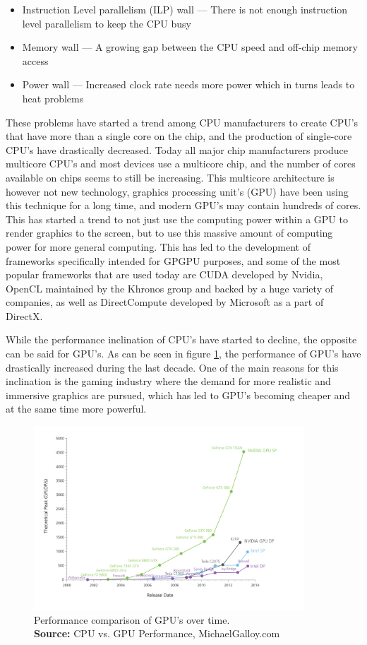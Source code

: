 \begin{itemize}
    \item Instruction Level parallelism (ILP) wall --- There is not enough instruction level parallelism to keep the CPU busy
    \item Memory wall --- A growing gap between the CPU speed and off-chip memory access
    \item Power wall --- Increased clock rate needs more power which in turns leads to heat problems
\end{itemize}

These problems have started a trend among CPU manufacturers to create CPU's that have more than a single core on the chip, and the production of single-core CPU's have drastically decreased. Today all major chip manufacturers produce multicore CPU's and most devices use a multicore chip, and the number of cores available on chips seems to still be increasing. This multicore architecture is however not new technology, graphics processing unit's (GPU) have been using this technique for a long time, and modern GPU's may contain hundreds of cores. This has started a trend to not just use the computing power within a GPU to render graphics to the screen, but to use this massive amount of computing power for more general computing. This has led to the development of frameworks specifically intended for GPGPU purposes, and some of the most popular frameworks that are used today are CUDA developed by Nvidia, OpenCL maintained by the Khronos group and backed by a huge variety of companies, as well as DirectCompute developed by Microsoft as a part of DirectX. 

While the performance inclination of CPU's have started to decline, the opposite can be said for GPU's. As can be seen in figure \ref{fig:GPUStats}, the performance of GPU's have drastically increased during the last decade. One of the main reasons for this inclination is the gaming industry where the demand for more realistic and immersive graphics are pursued, which has led to GPU's becoming cheaper and at the same time more powerful.

\begin{figure}[!htbp]
    \centering
    \includegraphics [width=0.9\textwidth]{Introduction/Figs/GPUstats.png}
    \caption{Performance comparison of GPU's over time. \\ \textbf{Source:} CPU vs. GPU Performance, MichaelGalloy.com}
    \label{fig:GPUStats}
\end{figure}

